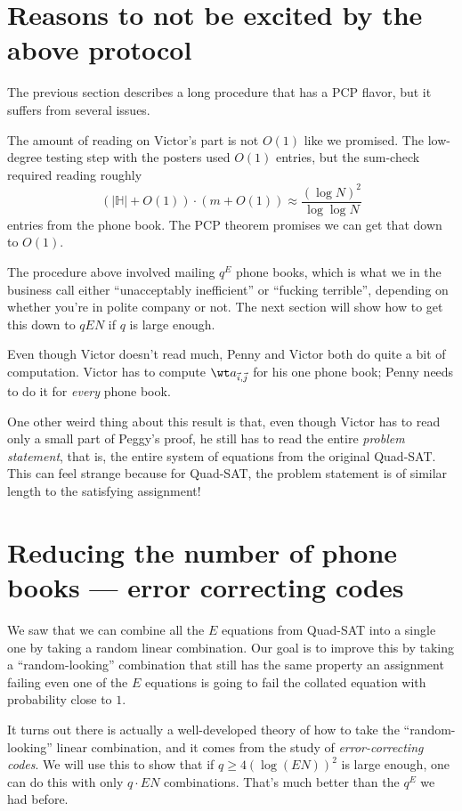 \documentclass[11pt]{scrreprt}
\begin{document}
\section{Reasons to not be excited by the above protocol}
The previous section describes a long procedure that has a PCP flavor,
but it suffers from several issues.
\begin{itemize}
  \ii The amount of reading on Victor's part is not $O(1)$ like we promised.
  The low-degree testing step with the posters used $O(1)$ entries,
  but the sum-check required reading roughly
  \[ (|\mathbb H| + O(1)) \cdot (m+O(1)) \approx \frac{(\log N)^2}{\log \log N} \]
  entries from the phone book.
  The PCP theorem promises we can get that down to $O(1)$.

  \ii The procedure above involved mailing $q^E$ phone books,
  which is what we in the business call either ``unacceptably inefficient''
  or ``fucking terrible'', depending on whether you're in polite company or not.
  The next section will show how to get this down to $qEN$ if $q$ is large enough.

  \ii Even though Victor doesn't read much,
  Penny and Victor both do quite a bit of computation.
  Victor has to compute $\wt a_{\vec i, \vec j}$ for his one phone book;
  Penny needs to do it for \emph{every} phone book.

  \ii One other weird thing about this result is that,
  even though Victor has to read only a small part of Peggy's proof,
  he still has to read the entire \emph{problem statement},
  that is, the entire system of equations from the original Quad-SAT.
  This can feel strange because for Quad-SAT,
  the problem statement is of similar length to the satisfying assignment!

\end{itemize}

\section{Reducing the number of phone books --- error correcting codes}
We saw that we can combine all the $E$ equations from Quad-SAT into a single one
by taking a random linear combination.
Our goal is to improve this by taking a ``random-looking'' combination
that still has the same property an assignment failing even one of the $E$ equations
is going to fail the collated equation with probability close to $1$.

It turns out there is actually a well-developed theory of how to take
the ``random-looking'' linear combination,
and it comes from the study of \emph{error-correcting codes}.
We will use this to show that if $q \ge 4(\log (EN))^2$ is large enough,
one can do this with only $q \cdot EN$ combinations.
That's much better than the $q^E$ we had before.
\end{document}
